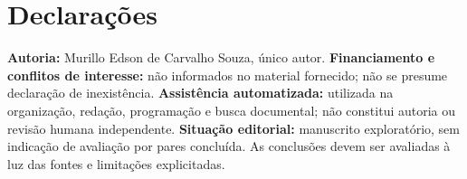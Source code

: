 \section*{Declarações}
\textbf{Autoria:} Murillo Edson de Carvalho Souza, único autor. \textbf{Financiamento e conflitos de interesse:} não informados no material fornecido; não se presume declaração de inexistência. \textbf{Assistência automatizada:} utilizada na organização, redação, programação e busca documental; não constitui autoria ou revisão humana independente. \textbf{Situação editorial:} manuscrito exploratório, sem indicação de avaliação por pares concluída. As conclusões devem ser avaliadas à luz das fontes e limitações explicitadas.
